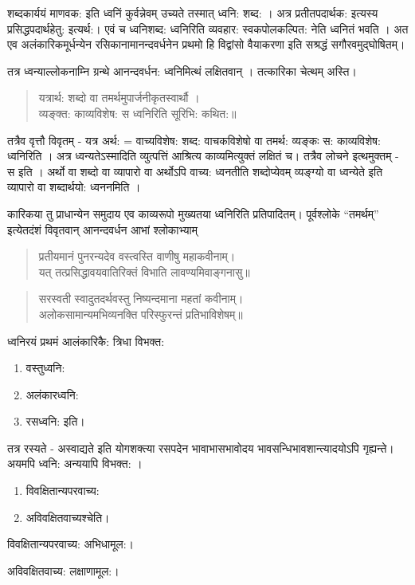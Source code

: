 {शब्दकार्ययं माणवक: इति ध्वनिं कुर्वन्नेवम् उच्यते तस्मात् ध्वनि: शब्द: । अत्र प्रतीतपदार्थक: इत्यस्य प्रसिद्धपदार्थहेतु: इत्यर्थ:। एवं च ध्वनिशब्द: ध्वनिरिति व्यवहार: स्वकपोलकल्पित: नेति ध्वनितं भवति । अत एव अलंकारिकमूर्धन्येन रसिकानामानन्दवर्धनेन प्रथमो हि विद्वांसो वैयाकरणा इति सश्रद्धं सगौरवमुद्घोषितम्।

तत्र ध्वन्याल्लोकनाम्नि ग्रन्थे आनन्दवर्धन: ध्वनिमित्थं लक्षितवान् । तत्कारिका चेत्थम् अस्ति।
\begin{verse}
यत्रार्थ: शब्दो वा तमर्थमुपार्जनीकृतस्वार्थौ ।\\
व्यङ्क्त: काव्यविशेष: स ध्वनिरिति सूरिभि: कथित:॥
\end{verse}
तत्रैव वृत्तौ विवृतम् - यत्र अर्थ: = वाच्यविशेष: शब्द: वाचकविशेषो वा तमर्थ: व्यङ्कः स: काव्यविशेष: ध्वनिरिति । अत्र ध्वन्यतेऽस्मादिति व्युत्पत्तिं आश्रित्य काव्यमित्युक्तं लक्षितं च। तत्रैव लोचने इत्थमुक्तम् - स इति । अर्थो वा शब्दो वा व्यापारो वा अर्थोऽपि वाच्य: ध्वनतीति शब्दोप्येवम् व्यङ्ग्यो वा ध्वन्येते इति व्यापारो वा शब्दार्थयो: ध्वननमिति ।

कारिकया तु प्राधान्येन समुदाय एव काव्यरूपो मुख्यतया ध्वनिरिति प्रतिपादितम्। पूर्वश्लोके “तमर्थम्” इत्येतदंशं विवृतवान् आनन्दवर्धन आभां श्लोकाभ्याम् 
\begin{verse}
प्रतीयमानं पुनरन्यदेव वस्त्वस्ति वाणीषु महाकवीनाम्।\\
यत् तत्प्रसिद्धावयवातिरिक्तं विभाति लावण्यमिवाङ्गनासु॥
\end{verse}
\begin{verse}
सरस्वती स्वादुतदर्थवस्तु निष्यन्दमाना महतां कवीनाम्।\\
अलोकसामान्यमभिव्यनक्ति परिस्फुरन्तं प्रतिभाविशेषम्॥
\end{verse}
ध्वनिरयं प्रथमं आलंकारिकै: त्रिधा विभक्त:
\begin{enumerate}
\item वस्तुध्वनि:
\item अलंकारध्वनि:
\item रसध्वनि: इति।
\end{enumerate}

तत्र रस्यते - अस्वाद्यते इति योगशक्त्या रसपदेन भावाभासभावोदय भावसन्धिभावशान्त्यादयोऽपि गृह्यन्ते। अयमपि ध्वनि: अन्ययापि विभक्त: ।
\begin{enumerate}
\item विवक्षितान्यपरवाच्य:
\item अविवक्षितवाच्यश्चेति।
\end{enumerate}
विवक्षितान्यपरवाच्य: अभिधामूल:।

अविवक्षितवाच्य: लक्षाणामूल:।

}
